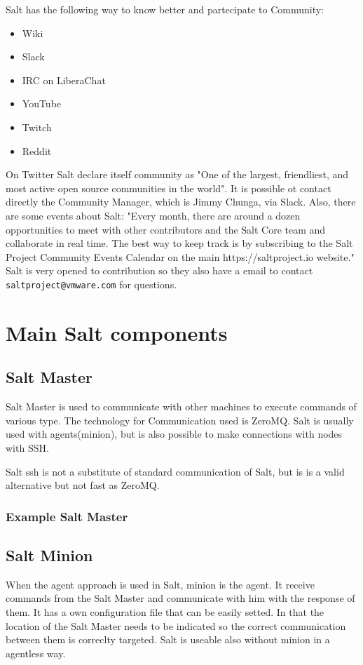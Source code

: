 \documentclass[12pt,a4paper,openright,twoside]{book}
\begin{document}
Salt has the following way to know better and partecipate to Community:
\begin{itemize}
    \item Wiki
    \item Slack
    \item IRC on LiberaChat
    \item YouTube
    \item Twitch
    \item Reddit
\end{itemize}
On Twitter Salt declare itself community as "One of the largest, friendliest, and most active open source communities in the world"\cite{saltTwitter}.
It is possible ot contact directly the Community Manager, which is Jimmy Chunga, via Slack.
Also, there are some events about Salt:
"Every month, there are around a dozen opportunities to meet with other contributors and the Salt Core team and collaborate in real time. The best way to keep track is by subscribing to the Salt Project Community Events Calendar on the main https://saltproject.io website."\cite{saltGitHub}
Salt is very opened to contribution so they also have a email to contact \texttt{saltproject@vmware.com} for questions.

\section{Main Salt components}

\subsection{Salt Master}

Salt Master is used to communicate with other machines to execute commands of various type.
The technology for Communication used is ZeroMQ. Salt is usually used with agents(minion), but is also possible to make connections with nodes with SSH.


Salt ssh is not a substitute of standard communication of Salt, but is is a valid alternative but not fast as ZeroMQ\cite{saltSSH}.


\subsubsection{Example Salt Master}

\subsection{Salt Minion}
When the agent approach is used in Salt, minion is the agent. It receive commands from the Salt Master and communicate with him with the response of them. It has a own configuration file that can be easily setted. In that the location of the Salt Master needs to be indicated so the correct communication between them is correclty targeted.
Salt is useable also without minion in a agentless way.
\end{document}
